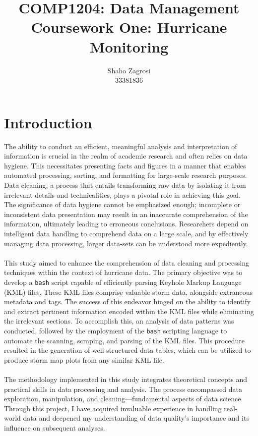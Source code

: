 \documentclass[]{article}
\title{COMP1204: Data Management \\ Coursework One: Hurricane Monitoring }
\author{Shaho Zagrosi \\ 33381836}
\begin{document}
    \maketitle
    \section{Introduction}
    The ability to conduct an efficient, meaningful analysis and interpretation of information is crucial in the realm of academic research and often relies on data hygiene. This necessitates presenting facts and figures in a manner that enables automated processing, sorting, and formatting for large-scale research purposes. Data cleaning, a process that entails transforming raw data by isolating it from irrelevant details and technicalities, plays a pivotal role in achieving this goal. The significance of data hygiene cannot be emphasized enough; incomplete or inconsistent data presentation may result in an inaccurate comprehension of the information, ultimately leading to erroneous conclusions. Researchers depend on intelligent data handling to comprehend data on a large scale, and by effectively managing data processing, larger data-sets can be understood more expediently.
    \\\\
    This study aimed to enhance the comprehension of data cleaning and processing techniques within the context of hurricane data. The primary objective was to develop a \verb|bash| script capable of efficiently parsing Keyhole Markup Language (KML) files. These KML files comprise valuable storm data, alongside extraneous metadata and tags. The success of this endeavor hinged on the ability to identify and extract pertinent information encoded within the KML files while eliminating the irrelevant sections. To accomplish this, an analysis of data patterns was conducted, followed by the employment of the \verb|bash| scripting language to automate the scanning, scraping, and parsing of the KML files. This procedure resulted in the generation of well-structured data tables, which can be utilized to produce storm map plots from any similar KML file.
    \\\\
    The methodology implemented in this study integrates theoretical concepts and practical skills in data processing and analysis. The process encompassed data exploration, manipulation, and cleaning—fundamental aspects of data science. Through this project, I have acquired invaluable experience in handling real-world data and deepened my understanding of data quality's importance and its influence on subsequent analyses.
\end{document}
